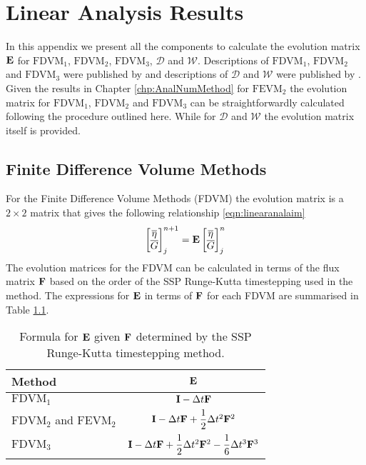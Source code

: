 \chapter{Linear Analysis Results}
\label{app:LinAnal}
In this appendix we present all the components to calculate the evolution matrix $\mathbf{E}$ for $\text{FDVM}_1$, $\text{FDVM}_2$, $\text{FDVM}_3$, $\mathcal{D}$ and $\mathcal{W}$. Descriptions of
$\text{FDVM}_1$, $\text{FDVM}_2$ and $\text{FDVM}_3$ were published by \citet{Zoppou-etal-2017} and descriptions of $\mathcal{D}$ and $\mathcal{W}$ were published by \citet{Pitt-2018-61}. Given the results in Chapter \ref{chp:AnalNumMethod} for $\text{FEVM}_2$ the evolution matrix for $\text{FDVM}_1$, $\text{FDVM}_2$ and $\text{FDVM}_3$ can be straightforwardly calculated following the procedure outlined here. While for $\mathcal{D}$ and $\mathcal{W}$ the evolution matrix itself is provided.  

\section{Finite Difference Volume Methods}
For the Finite Difference Volume Methods (FDVM) the evolution matrix is a $2\times2$ matrix that gives the following relationship \eqref{eqn:linearanalaim}
\begin{equation}
\label{eqn:AppDEFDVM}
\begin{bmatrix}
\overline{\eta} \\\overline{G} 
\end{bmatrix}^{n+1}_j = \mathbf{E} \begin{bmatrix}
\overline{\eta} \\\overline{G}
\end{bmatrix}^{n}_j
\end{equation}
The evolution matrices for the FDVM can be calculated in terms of the flux matrix $\mathbf{F}$  based on the order of the SSP Runge-Kutta timestepping used in the method. The expressions for $\mathbf{E}$ in terms of $\mathbf{F}$ for each FDVM are summarised in Table \ref{tab:RKstepfactor}.
\begin{table}
	\centering
	\begin{tabular}{l  c}
		Method & $\mathbf{E}$  \T\B \\
		\hline 
		$\text{FDVM}_1$& $\mathbf{I} - \Delta t\mathbf{F} $  \T\B \\
		$\text{FDVM}_2$ and $\text{FEVM}_2$ & $ \mathbf{I}  -\Delta t\mathbf{F} + \dfrac{1}{2}\Delta t^2\mathbf{F}^2$  \T\B \\
		$\text{FDVM}_3$& $\mathbf{I} -\Delta t\mathbf{F} + \dfrac{1}{2}\Delta t^2 \mathbf{F}^2 - \dfrac{1}{6}\Delta t^3 \mathbf{F}^3 $  \T\B \\
		\hline
	\end{tabular}
	\caption{Formula for $\mathbf{E}$ given $\mathbf{F}$ determined by the SSP Runge-Kutta timestepping method.}
	\label{tab:RKstepfactor}
\end{table}

